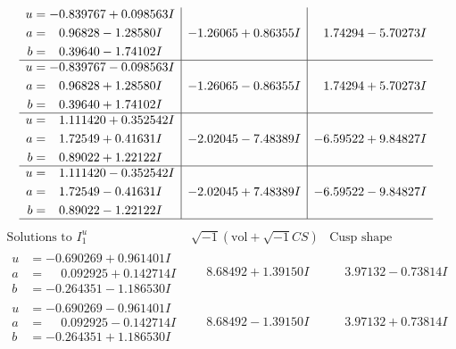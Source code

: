\documentclass[1p]{elsarticle_modified}
\theoremstyle{definition}
\newcommand{\I}{\sqrt{-1}}
\begin{document}
$$\begin{array}{c|c|c}
\begin{aligned}
u &= -0.839767 + 0.098563 I \\
a &= \phantom{-}0.96828 - 1.28580 I \\
b &= \phantom{-}0.39640 - 1.74102 I\end{aligned}
 & -1.26065 + 0.86355 I & \phantom{-}1.74294 - 5.70273 I \\ \hline\begin{aligned}
u &= -0.839767 - 0.098563 I \\
a &= \phantom{-}0.96828 + 1.28580 I \\
b &= \phantom{-}0.39640 + 1.74102 I\end{aligned}
 & -1.26065 - 0.86355 I & \phantom{-}1.74294 + 5.70273 I \\ \hline\begin{aligned}
u &= \phantom{-}1.111420 + 0.352542 I \\
a &= \phantom{-}1.72549 + 0.41631 I \\
b &= \phantom{-}0.89022 + 1.22122 I\end{aligned}
 & -2.02045 - 7.48389 I & -6.59522 + 9.84827 I \\ \hline\begin{aligned}
u &= \phantom{-}1.111420 - 0.352542 I \\
a &= \phantom{-}1.72549 - 0.41631 I \\
b &= \phantom{-}0.89022 - 1.22122 I\end{aligned}
 & -2.02045 + 7.48389 I & -6.59522 - 9.84827 I\\
 \hline 
 \end{array}$$\newpage$$\begin{array}{c|c|c}  
\text{Solutions to }I^u_{1}& \I (\text{vol} + \sqrt{-1}CS) & \text{Cusp shape}\\
 \hline 
\begin{aligned}
u &= -0.690269 + 0.961401 I \\
a &= \phantom{-}0.092925 + 0.142714 I \\
b &= -0.264351 - 1.186530 I\end{aligned}
 & \phantom{-}8.68492 + 1.39150 I & \phantom{-}3.97132 - 0.73814 I \\ \hline\begin{aligned}
u &= -0.690269 - 0.961401 I \\
a &= \phantom{-}0.092925 - 0.142714 I \\
b &= -0.264351 + 1.186530 I\end{aligned}
 & \phantom{-}8.68492 - 1.39150 I & \phantom{-}3.97132 + 0.73814 I \\ \hline\begin{aligned}

\end{aligned}
\end{array}$$
\end{document}
